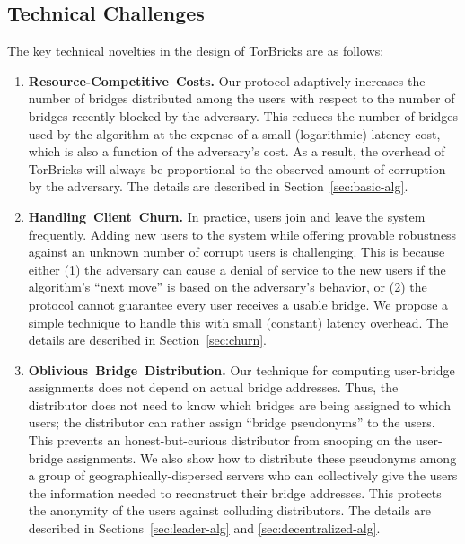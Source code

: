 \documentclass[a4paper,UKenglish]{lipics-v2016}
\newcommand{\fullpaper}[1]{#1}
\newcommand{\fullpaper}[1]{}
\newcommand{\bricks}{}
\def\bricks/{\mbox{TorBricks}}
\newcommand{\sfsize}{\fontsize{0.68\baselineskip}{0.68\baselineskip}\selectfont}
\newcommand{\sans}[1]{\textbf{\textsf{\sfsize \mbox{#1}}}}
\begin{document}
\subsection{Technical Challenges} 
The key technical novelties in the design of \bricks/ are as follows:
\begin{enumerate}[leftmargin=1.7em, itemsep=0.7em, topsep=0.6em]
	\item \sans{Resource-Competitive Costs.} Our protocol adaptively increases the number of bridges distributed among the users with respect to the number of bridges recently blocked by the adversary. This reduces the number of bridges used by the algorithm at the expense of a small (logarithmic) latency cost, which is also a function of the adversary's cost. As a result, the overhead of \bricks/ will always be proportional to the observed amount of corruption by the adversary. The details are described in Section~\ref{sec:basic-alg}.  %
	
	\item \sans{Handling Client Churn.} In practice, users join and leave the system frequently. Adding new users to the system while offering provable robustness against an unknown number of corrupt users is challenging. This is because either (1) the adversary can cause a denial of service to the new users if the algorithm's ``next move'' is based on the adversary's behavior, or (2) the protocol cannot guarantee every user receives a usable bridge. We propose a simple technique to handle this with small (constant) latency overhead. The details are described in Section~\ref{sec:churn}.	
	
	\item \sans{Oblivious Bridge Distribution.} Our technique for computing user-bridge assignments does not depend on actual bridge addresses. Thus, \fullpaper{the distributor does not need to know which bridges are being assigned to which users;} the distributor can \fullpaper{rather} assign ``bridge pseudonyms'' to the users. This prevents an honest-but-curious distributor from snooping on the user-bridge assignments.
	We also show how to distribute these pseudonyms among a group of geographically-dispersed servers who can collectively give the users the information needed to reconstruct their bridge addresses. This protects the anonymity of the users against colluding distributors. The details are described in Sections~\ref{sec:leader-alg} and \ref{sec:decentralized-alg}.
	

\end{enumerate}
\end{document}
